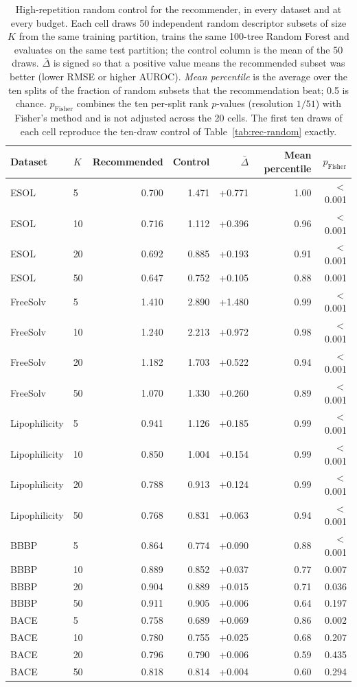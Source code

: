 \begin{table}[H]
\renewcommand{\thetable}{S5}
\centering
\small
\begin{tabular}{llrrrrr}
\toprule
Dataset & $K$ & Recommended & Control & $\bar\Delta$ & Mean percentile & $p_{\mathrm{Fisher}}$ \\
\midrule
ESOL & 5 & 0.700 & 1.471 & +0.771 & 1.00 & $<$0.001 \\
ESOL & 10 & 0.716 & 1.112 & +0.396 & 0.96 & $<$0.001 \\
ESOL & 20 & 0.692 & 0.885 & +0.193 & 0.91 & $<$0.001 \\
ESOL & 50 & 0.647 & 0.752 & +0.105 & 0.88 & 0.001 \\
\midrule
FreeSolv & 5 & 1.410 & 2.890 & +1.480 & 0.99 & $<$0.001 \\
FreeSolv & 10 & 1.240 & 2.213 & +0.972 & 0.98 & $<$0.001 \\
FreeSolv & 20 & 1.182 & 1.703 & +0.522 & 0.94 & $<$0.001 \\
FreeSolv & 50 & 1.070 & 1.330 & +0.260 & 0.89 & $<$0.001 \\
\midrule
Lipophilicity & 5 & 0.941 & 1.126 & +0.185 & 0.99 & $<$0.001 \\
Lipophilicity & 10 & 0.850 & 1.004 & +0.154 & 0.99 & $<$0.001 \\
Lipophilicity & 20 & 0.788 & 0.913 & +0.124 & 0.99 & $<$0.001 \\
Lipophilicity & 50 & 0.768 & 0.831 & +0.063 & 0.94 & $<$0.001 \\
\midrule
BBBP & 5 & 0.864 & 0.774 & +0.090 & 0.88 & $<$0.001 \\
BBBP & 10 & 0.889 & 0.852 & +0.037 & 0.77 & 0.007 \\
BBBP & 20 & 0.904 & 0.889 & +0.015 & 0.71 & 0.036 \\
BBBP & 50 & 0.911 & 0.905 & +0.006 & 0.64 & 0.197 \\
\midrule
BACE & 5 & 0.758 & 0.689 & +0.069 & 0.86 & 0.002 \\
BACE & 10 & 0.780 & 0.755 & +0.025 & 0.68 & 0.207 \\
BACE & 20 & 0.796 & 0.790 & +0.006 & 0.59 & 0.435 \\
BACE & 50 & 0.818 & 0.814 & +0.004 & 0.60 & 0.294 \\
\bottomrule
\end{tabular}
\caption{High-repetition random control for the recommender, in every dataset and at every budget. Each cell draws 50 independent random descriptor subsets of size $K$ from the same training partition, trains the same 100-tree Random Forest and evaluates on the same test partition; the control column is the mean of the 50 draws. $\bar\Delta$ is signed so that a positive value means the recommended subset was better (lower RMSE or higher AUROC). \emph{Mean percentile} is the average over the ten splits of the fraction of random subsets that the recommendation beat; 0.5 is chance. $p_{\mathrm{Fisher}}$ combines the ten per-split rank $p$-values (resolution $1/51$) with Fisher's method and is not adjusted across the 20 cells. The first ten draws of each cell reproduce the ten-draw control of Table~\ref{tab:rec-random} exactly.}
\label{tab:random-control}
\end{table}
